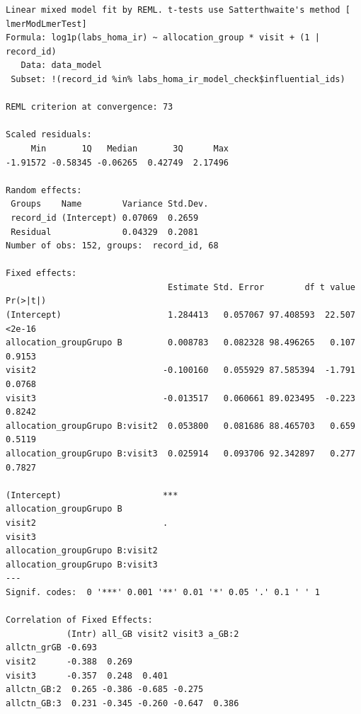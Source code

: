 \documentclass[
  letterpaper,
  DIV=11,
  numbers=noendperiod]{scrartcl}
\newenvironment{Shaded}{\begin{snugshade}}{\end{snugshade}}
\newcommand{\NormalTok}[1]{\textcolor[rgb]{0.00,0.23,0.31}{#1}}
\newcommand{\SpecialCharTok}[1]{\textcolor[rgb]{0.37,0.37,0.37}{#1}}
\begin{document}
\begin{verbatim}
Linear mixed model fit by REML. t-tests use Satterthwaite's method [
lmerModLmerTest]
Formula: log1p(labs_homa_ir) ~ allocation_group * visit + (1 | record_id)
   Data: data_model
 Subset: !(record_id %in% labs_homa_ir_model_check$influential_ids)

REML criterion at convergence: 73

Scaled residuals: 
     Min       1Q   Median       3Q      Max 
-1.91572 -0.58345 -0.06265  0.42749  2.17496 

Random effects:
 Groups    Name        Variance Std.Dev.
 record_id (Intercept) 0.07069  0.2659  
 Residual              0.04329  0.2081  
Number of obs: 152, groups:  record_id, 68

Fixed effects:
                                Estimate Std. Error        df t value Pr(>|t|)
(Intercept)                     1.284413   0.057067 97.408593  22.507   <2e-16
allocation_groupGrupo B         0.008783   0.082328 98.496265   0.107   0.9153
visit2                         -0.100160   0.055929 87.585394  -1.791   0.0768
visit3                         -0.013517   0.060661 89.023495  -0.223   0.8242
allocation_groupGrupo B:visit2  0.053800   0.081686 88.465703   0.659   0.5119
allocation_groupGrupo B:visit3  0.025914   0.093706 92.342897   0.277   0.7827
                                  
(Intercept)                    ***
allocation_groupGrupo B           
visit2                         .  
visit3                            
allocation_groupGrupo B:visit2    
allocation_groupGrupo B:visit3    
---
Signif. codes:  0 '***' 0.001 '**' 0.01 '*' 0.05 '.' 0.1 ' ' 1

Correlation of Fixed Effects:
            (Intr) all_GB visit2 visit3 a_GB:2
allctn_grGB -0.693                            
visit2      -0.388  0.269                     
visit3      -0.357  0.248  0.401              
allctn_GB:2  0.265 -0.386 -0.685 -0.275       
allctn_GB:3  0.231 -0.345 -0.260 -0.647  0.386
\end{verbatim}

\begin{Shaded}
\end{Shaded}
\end{document}
